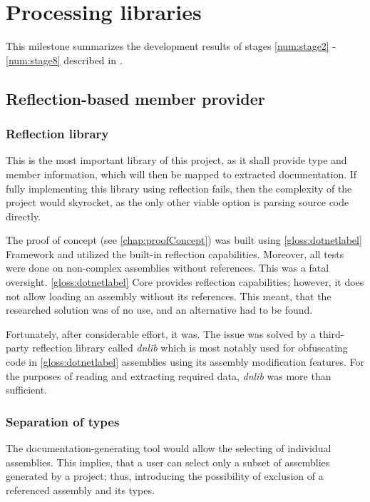 \chapter{Processing libraries}

This milestone summarizes the development results of stages \ref{num:stage2} - \ref{num:stage8} described in .

\section{Reflection-based member provider}

\subsection{Reflection library}

This is the most important library of this project, as it shall provide type and member information, which will then be mapped to extracted documentation. If fully implementing this library using reflection fails, then the complexity of the project would skyrocket, as the only other viable option is parsing source code directly.

The proof of concept (see \ref{chap:proofConcept}) was built using \ref{gloss:dotnetlabel} Framework and utilized the built-in reflection capabilities. Moreover, all tests were done on non-complex assemblies without references. This was a fatal oversight. \ref{gloss:dotnetlabel} Core provides reflection capabilities; however, it does not allow loading an assembly without its references. This meant, that the researched solution was of no use, and an alternative had to be found.

Fortunately, after considerable effort, it was. The issue was solved by a third-party reflection library called \textit{dnlib} which is most notably used for obfuscating code in \ref{gloss:dotnetlabel} assemblies using its assembly modification features. For the purposes of reading and extracting required data, \textit{dnlib} was more than sufficient.

\subsection{Separation of types}

The documentation-generating tool would allow the selecting of individual assemblies. This implies, that a user can select only a subset of assemblies generated by a project; thus, introducing the possibility of exclusion of a referenced assembly and its types.

